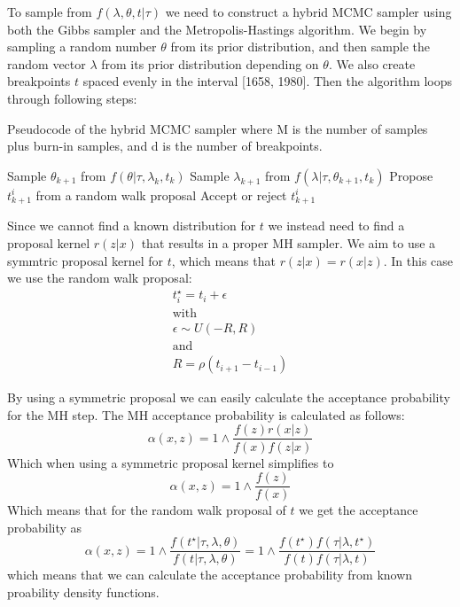 \documentclass[a4paper]{article}
\begin{document}
To sample from $f(\lambda, \theta, t | \tau)$ we need to construct a hybrid MCMC sampler using both the Gibbs sampler and the Metropolis-Hastings algorithm. We begin by sampling a random number $\theta$ from its prior distribution, and then sample the random vector \textbf{$\lambda$} from its prior distribution depending on $\theta$. We also create breakpoints $t$ spaced evenly in the interval [1658, 1980]. Then the algorithm loops through following steps:

\begin{algorithm}
    \caption{Pseudocode of the hybrid MCMC sampler where M is the number of samples plus burn-in samples, and d is the number of breakpoints.}
    \begin{algorithmic}
        \State Sample $\theta_{k+1}$ from $f(\theta|\tau, \lambda_k, t_k)$
        \State Sample $\lambda_{k+1}$ from $f(\lambda|\tau, \theta_{k+1}, t_k)$
        \State Propose $t_{k+1}^i$ from a random walk proposal
        \State Accept or reject $t_{k+1}^i$
        \EndFor
        \EndFor
    \end{algorithmic}
\end{algorithm}

Since we cannot find a known distribution for $t$ we instead need to find a proposal kernel $r(z|x)$ that results in a proper MH sampler. We aim to use a symmtric proposal kernel for $t$, which means that $r(z|x) = r(x|z)$. In this case we use the random walk proposal:
\begin{gather*}
    t_i^\star = t_i + \epsilon \\
    \text{with} \\
    \epsilon \sim U(-R,R) \\
    \text{and} \\
    R = \rho(t_{i+1}-t_{i-1})
\end{gather*}

By using a symmetric proposal we can easily calculate the acceptance probability for the MH step. The MH acceptance probability is calculated as follows:
\begin{equation}
    \alpha(x,z) = 1 \wedge \frac{f(z)r(x|z)}{f(x)f(z|x)}
\end{equation}
Which when using a symmetric proposal kernel simplifies to
\begin{equation}
    \alpha(x,z) = 1 \wedge \frac{f(z)}{f(x)}
\end{equation}
Which means that for the random walk proposal of $t$ we get the acceptance probability as
\begin{equation}
    \alpha(x,z) = 1 \wedge \frac{f(t^\star | \tau, \lambda, \theta)}{f(t | \tau, \lambda, \theta)} = 1 \wedge \frac{f(t^\star)f(\tau|\lambda,t^\star)}{f(t)f(\tau|\lambda,t)}
\end{equation}
which means that we can calculate the acceptance probability from known proability density functions.
\end{document}
